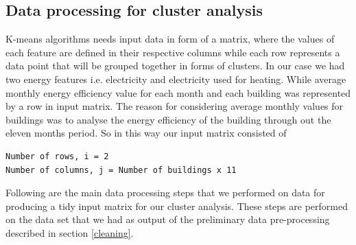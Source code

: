\subsection{Data processing for cluster analysis}
K-means algorithms needs input data in form of a matrix, where the values of each feature are defined in their respective columns while each row represents a data point that will be grouped together in forms of clusters. In our case we had two energy features i.e. electricity and electricity used for heating. While average monthly energy efficiency value for each month and each building was represented by a row in input matrix. The reason for considering average monthly values for buildings was to analyse the energy efficiency of the building through out the eleven months period. So in this way our input matrix consisted of 
\begin{lstlisting}
Number of rows, i = 2
Number of columns, j = Number of buildings x 11 
\end{lstlisting}
Following are the main data processing steps that we performed on data for producing a tidy input matrix for our cluster analysis. These steps are performed on the data set that we had as output of the preliminary data pre-processing described in section \ref{cleaning}.
